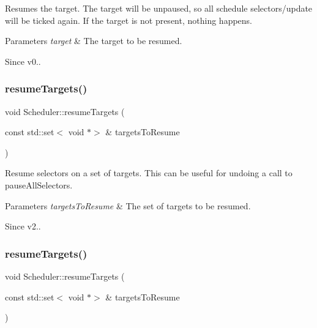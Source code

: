 Resumes the target. The \textquotesingle{}target\textquotesingle{} will be unpaused, so all schedule selectors/update will be \textquotesingle{}ticked\textquotesingle{} again. If the target is not present, nothing happens. 
\begin{DoxyParams}{Parameters}
{\em target} & The target to be resumed. \\
\hline
\end{DoxyParams}
\begin{DoxySince}{Since}
v0.. 
\end{DoxySince}
\mbox{\label{classScheduler_a5b568bffe196f3a5cefe0739354dc900}} 
\subsubsection{\texorpdfstring{resume\+Targets()}{resumeTargets()}\hspace{0.1cm}{\footnotesize\ttfamily [1/2]}}
{\footnotesize\ttfamily void Scheduler\+::resume\+Targets (\begin{DoxyParamCaption}\item[{const std\+::set$<$ void $\ast$$>$ \&}]{targets\+To\+Resume }\end{DoxyParamCaption})}

Resume selectors on a set of targets. This can be useful for undoing a call to pause\+All\+Selectors. 
\begin{DoxyParams}{Parameters}
{\em targets\+To\+Resume} & The set of targets to be resumed. \\
\hline
\end{DoxyParams}
\begin{DoxySince}{Since}
v2.. 
\end{DoxySince}
\mbox{\label{classScheduler_a5b568bffe196f3a5cefe0739354dc900}} 
\subsubsection{\texorpdfstring{resume\+Targets()}{resumeTargets()}\hspace{0.1cm}{\footnotesize\ttfamily [2/2]}}
{\footnotesize\ttfamily void Scheduler\+::resume\+Targets (\begin{DoxyParamCaption}\item[{const std\+::set$<$ void $\ast$$>$ \&}]{targets\+To\+Resume }\end{DoxyParamCaption})}

